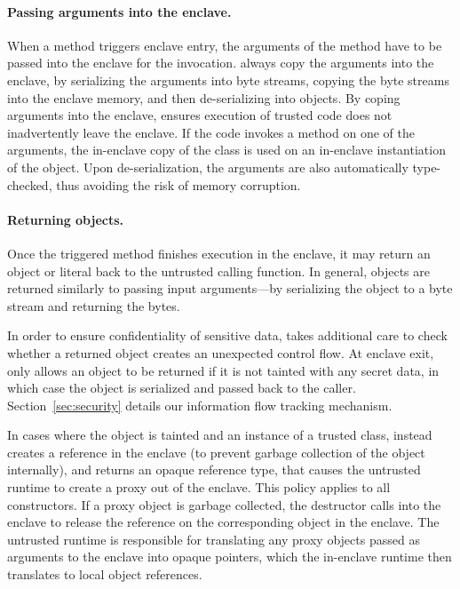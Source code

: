 \paragraph{Passing arguments into the enclave.}
When a method triggers enclave entry, the arguments of the method have to be passed into the enclave for the invocation.
\systemname{} always copy the arguments into the enclave,
by serializing the arguments into byte streams,
copying the byte streams into the enclave memory,
and then de-serializing into objects.
By coping arguments into the enclave,
\systemname{} ensures execution of trusted code does not inadvertently leave the enclave.
If the code invokes a method on one of the arguments,
the in-enclave copy of the class is used on an in-enclave instantiation of the object.
Upon de-serialization, the arguments are also automatically type-checked,
thus avoiding the risk of memory corruption.

\paragraph{Returning objects.}
Once the triggered method finishes execution in the enclave,
it may return an object or literal back to the untrusted calling function.
In general, objects are returned similarly to passing input arguments---by serializing the object to a byte stream and returning the bytes.

In order to ensure confidentiality of sensitive data, \systemname{} takes additional care to check
whether a returned object creates an unexpected control flow.
At enclave exit, \systemname{} only allows an object to be returned if it is not tainted with any secret data,
in which case the object is serialized and passed back to the caller.
Section~\ref{sec:security} details our information flow tracking mechanism.

In cases where the object is tainted and an instance of a trusted class,
\systemname{} instead creates a reference in the enclave (to prevent garbage collection of the object internally),
and returns an opaque reference type, that causes the untrusted \systemname{} runtime to create a proxy out of the enclave.
This policy applies to all constructors.
If a proxy object is garbage collected, the destructor calls into the enclave to release the reference on the 
corresponding object in the enclave.
The \systemname{} untrusted runtime is responsible for translating any proxy objects passed as arguments to the enclave into opaque pointers,
which the in-enclave runtime then translates to local object references.

